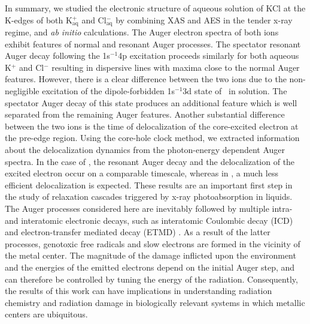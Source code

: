 In summary, we studied the electronic structure of aqueous solution of KCl at the K-edges of both K$^{+}_{\text{aq}}$ and Cl$^{-}_{\text{aq}}$ by combining XAS and AES in the tender x-ray regime, and {\it ab initio} calculations. The Auger electron spectra of both ions exhibit features of normal and resonant Auger processes. The spectator resonant Auger decay following the 1s$^{-1}$4p excitation proceeds similarly for both aqueous K$^{+}$ and Cl$^{-}$ resulting in dispersive lines with maxima close to the normal Auger features. However, there is a clear difference between the two ions due to the non-negligible excitation of the dipole-forbidden 1s$^{-1}$3d state of \ki~in solution. The spectator Auger decay of this state produces an additional feature which is well separated from the remaining Auger features. {\color{red} Another substantial difference between the two ions is the time of delocalization of the core-excited electron at the pre-edge region. Using the core-hole clock method, we extracted information about the delocalization dynamics from the photon-energy dependent Auger spectra. In the case of \cli, the resonant Auger decay and the delocalization of the excited electron occur on a comparable timescale, whereas in \ki, a much less efficient delocalization is expected.} These results are an important first step in the study of relaxation cascades triggered by x-ray photoabsorption in liquids. The Auger processes considered here are inevitably followed by multiple intra- and interatomic electronic decays, such as interatomic Coulombic decay (ICD) and electron-transfer mediated decay (ETMD) \citep{unger17:708,Stumpf16:237}. As a result of the latter processes, genotoxic free radicals and slow electrons are formed in the vicinity of the metal center. The magnitude of the damage inflicted upon the environment and the energies of the emitted electrons depend on the initial Auger step, and can therefore be controlled by tuning the energy of the radiation. Consequently, the results of this work can have implications in understanding radiation chemistry and radiation damage in biologically relevant systems in which metallic centers are ubiquitous.